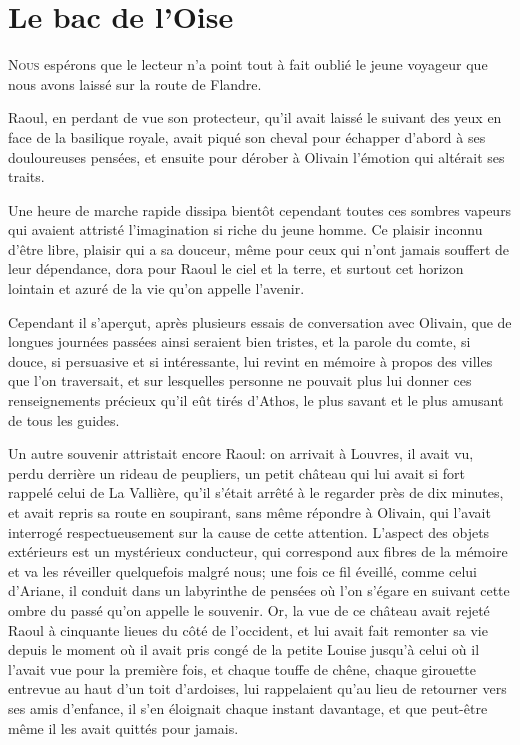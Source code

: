 \chapter{Le bac de l'Oise}

\lettrine{N}{ous} espérons que le lecteur n'a point tout à fait oublié le jeune voyageur que nous avons laissé sur la route de Flandre.

\zz
Raoul, en perdant de vue son protecteur, qu'il avait laissé le suivant des yeux en face de la basilique royale, avait piqué son cheval pour échapper d'abord à ses douloureuses pensées, et ensuite pour dérober à Olivain l'émotion qui altérait ses traits.

Une heure de marche rapide dissipa bientôt cependant toutes ces sombres vapeurs qui avaient attristé l'imagination si riche du jeune homme. Ce plaisir inconnu d'être libre, plaisir qui a sa douceur, même pour ceux qui n'ont jamais souffert de leur dépendance, dora pour Raoul le ciel et la terre, et surtout cet horizon lointain et azuré de la vie qu'on appelle l'avenir.

Cependant il s'aperçut, après plusieurs essais de conversation avec Olivain, que de longues journées passées ainsi seraient bien tristes, et la parole du comte, si douce, si persuasive et si intéressante, lui revint en mémoire à propos des villes que l'on traversait, et sur lesquelles personne ne pouvait plus lui donner ces renseignements précieux qu'il eût tirés d'Athos, le plus savant et le plus amusant de tous les guides.

Un autre souvenir attristait encore Raoul: on arrivait à Louvres, il avait vu, perdu derrière un rideau de peupliers, un petit château qui lui avait si fort rappelé celui de La Vallière, qu'il s'était arrêté à le regarder près de dix minutes, et avait repris sa route en soupirant, sans même répondre à Olivain, qui l'avait interrogé respectueusement sur la cause de cette attention. L'aspect des objets extérieurs est un mystérieux conducteur, qui correspond aux fibres de la mémoire et va les réveiller quelquefois malgré nous; une fois ce fil éveillé, comme celui d'Ariane, il conduit dans un labyrinthe de pensées où l'on s'égare en suivant cette ombre du passé qu'on appelle le souvenir. Or, la vue de ce château avait rejeté Raoul à cinquante lieues du côté de l'occident, et lui avait fait remonter sa vie depuis le moment où il avait pris congé de la petite Louise jusqu'à celui où il l'avait vue pour la première fois, et chaque touffe de chêne, chaque girouette entrevue au haut d'un toit d'ardoises, lui rappelaient qu'au lieu de retourner vers ses amis d'enfance, il s'en éloignait chaque instant davantage, et que peut-être même il les avait quittés pour jamais.

